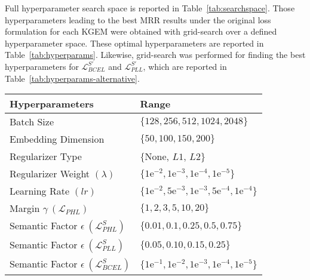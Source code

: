 \documentclass[letterpaper]{article} %
\begin{document}
Full hyperparameter search space is reported in Table~\ref{tab:searchspace}. Those hyperparameters leading to the best MRR results under the original loss formulation for each KGEM were obtained with grid-search over a defined hyperparameter space. These optimal hyperparameters are reported in Table~\ref{tab:hyperparams}. Likewise, grid-search was performed for finding the best hyperparameters for $\mathcal{L}^{S'}_{BCEL}$ and $\mathcal{L}^{S'}_{PLL}$, which are reported in Table~\ref{tab:hyperparams-alternative}.

\begin{table*}[h]
\small
\centering
\caption{Hyperparameter search space}\label{tab:searchspace}
\begin{tabular}{ll}
\hline 
Hyperparameters & Range \\
\hline 
Batch Size & $\{128,256,512,1024,2048\}$ \\
Embedding Dimension & $\{50,100,150,200\}$ \\
Regularizer Type & $\{$None, $L1$, $L2$$\}$ \\
Regularizer Weight $(\lambda)$ & $\{1\mathrm{e}^{-2}, 1\mathrm{e}^{-3}, 1\mathrm{e}^{-4}, 1\mathrm{e}^{-5}\}$ \\
Learning Rate $(l r)$ & $\{1\mathrm{e}^{-2},5\mathrm{e}^{-3},1\mathrm{e}^{-3},5\mathrm{e}^{-4},1\mathrm{e}^{-4}\}$ \\
Margin $\gamma~(\mathcal{L}_{PHL})$ & $\{1,2,3,5,10,20\}$\\
\hline
Semantic Factor $\epsilon~(\mathcal{L}^{S}_{PHL})$ & $\{0.01,0.1,0.25,0.5,0.75\}$\\
Semantic Factor $\epsilon~(\mathcal{L}^{S}_{PLL})$ & $\{0.05,0.10,0.15,0.25\}$\\
Semantic Factor $\epsilon~(\mathcal{L}^{S}_{BCEL})$ & $\{1\mathrm{e}^{-1}, 1\mathrm{e}^{-2},1\mathrm{e}^{-3}, 1\mathrm{e}^{-4},1\mathrm{e}^{-5}\}$\\
\hline
\end{tabular}
\end{table*}
\end{document}
